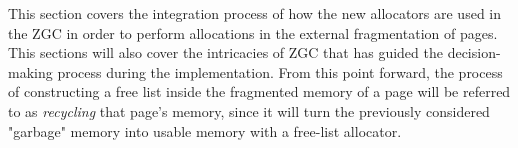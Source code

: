 This section covers the integration process of how the new allocators are used in the ZGC in order to perform allocations in the external fragmentation of pages. This sections will also cover the intricacies of ZGC that has guided the decision-making process during the implementation. From this point forward, the process of constructing a free list inside the fragmented memory of a page will be referred to as \textit{recycling} that page's memory, since it will turn the previously considered "garbage" memory into usable memory with a free-list allocator.


